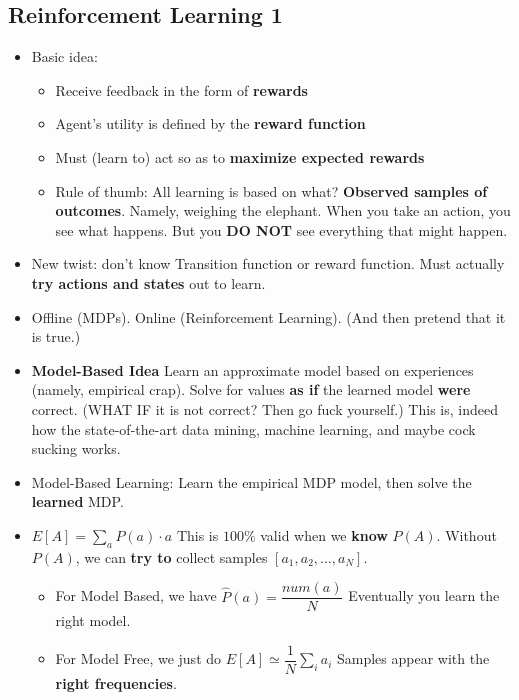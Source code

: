 \documentclass[twocolumn]{article}
\begin{document}
\subsection{Reinforcement Learning 1}
\label{sec:reinf-learn-1}

\begin{itemize}
\item Basic idea:
  \begin{itemize}
  \item Receive feedback in the form of \textbf{rewards}
  \item Agent's utility is defined by the \textbf{reward function}
  \item Must (learn to) act so as to \textbf{maximize expected
      rewards}
  \item Rule of thumb: All learning is based on what? \textbf{Observed
    samples of outcomes}. Namely, weighing the elephant. When you take
  an action, you see what happens. But you \textbf{DO NOT} see
  everything that might happen.
  \end{itemize}
\item New twist: don't know Transition function or reward
  function. Must actually \textbf{try actions and states} out to
  learn. 
\item Offline (MDPs). Online (Reinforcement Learning). (And then
  pretend that it is true.)
\item \textbf{Model-Based Idea} Learn an approximate model based on
  experiences (namely, empirical crap). Solve for values \textbf{as
    if} the learned model \textbf{were} correct. (WHAT IF it is not
  correct? Then go fuck yourself.) This is, indeed how the
  state-of-the-art data mining, machine learning, and maybe cock
  sucking works.
\item Model-Based Learning: Learn the empirical MDP model, then solve
  the \textbf{learned} MDP.
\item $E[A]=\sum_{a}P(a)\cdot a$ This is $100\%$ valid when we
  \textbf{know} $P(A)$. Without $P(A)$, we can \textbf{try to} collect
  samples $[a_{1},a_{2},\ldots,a_{N}]$.
  \begin{itemize}
  \item For Model Based, we have $\hat{P}(a)=\dfrac{num(a)}{N}$
    Eventually you learn the right model.\\[1pt]
  \item For Model Free, we just do $E[A]\simeq \dfrac{1}{N}\sum_{i}
    a_{i}$ Samples appear with the \textbf{right frequencies}.
  \end{itemize}

\end{itemize}
\end{document}
